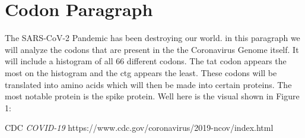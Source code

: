 \section{Codon Paragraph}

The SARS-CoV-2 Pandemic has been destroying our world. 
in this paragraph we will analyze the codons that are present in the the Coronavirus Genome itself. 
It will include a histogram of all 66 different codons. 
The tat codon appears the most on the histogram and the ctg appears the least. 
These codons will be translated into amino acids which will then be made into certain proteins. 
The most notable protein is the spike protein. Well here is the visual shown in Figure 1:


\begin{thebibliography}{1}

 CDC \emph{COVID-19} https://www.cdc.gov/coronavirus/2019-ncov/index.html

\end{thebibliography}
